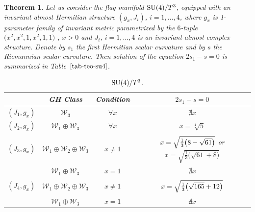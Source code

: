 \documentclass[10pt,a4paper]{amsart}
\numberwithin{equation}{section}
\newtheorem{Theorem}{Theorem}[section]
\begin{document}
\begin{Theorem} \label{teo-su4-t}
Let us consider the flag manifold ${\rm SU}(4)/T^3$, equipped with an invariant almost Hermitian structure $(g_x,J_i)$, $i=1,\ldots, 4$, where $g_x$ is 1-parameter family of invariant metric parametrized by the $6$-tuple $\big(x^{2},x^{2},1,x^{2},1,1\big)$ , $x>0$ and $J_i$, $i=1,\ldots, 4$ is an invariant almost complex structure. Denote by $s_1$ the first Hermitian scalar curvature and by $s$ the Riemannian scalar curvature. Then solution of the equation $2s_1-s=0$ is summarized in Table~$\ref{tab-teo-su4}$.

\begin{table}[h]\setlength{\tabcolsep}{4.5pt}
\renewcommand{\arraystretch}{1.2}
\centering
\caption{${\rm SU}(4)/T^3$.} \label{tab-teo-su4}
\begin{tabular}{c|c|c|c}\hline
 & GH Class & Condition & $2s_{1}-s=0$
 \\
\hline
$(J_{1},g_x)$ & $\mathcal{W}_{3}$ & $\forall x$ & $\nexists x$
\\
\hline
$(J_{2},g_x)$ & $\mathcal{W}_{1}\oplus \mathcal{W}_{3}$ & $\forall x$ & $x=\sqrt[4]{5}$
\\
\hline
$(J_{3},g_x)$ & $\mathcal{W}_{1}\oplus \mathcal{W}_{2}\oplus\mathcal{W}_{3}$ & $x\neq1$ & $\vphantom{\dfrac13^2}x=\sqrt{\frac{1}{3} \big(8-\sqrt{61}\big)}$ or $x=\sqrt{\frac{1}{3} \big(\sqrt{61}+8\big)}$
\\
 & $\mathcal{W}_{1}\oplus\mathcal{W}_{3}$ & $x=1$ & $\nexists x$
 \\
\hline
$(J_{4},g_x)$ & $\mathcal{W}_{1}\oplus \mathcal{W}_{2}\oplus\mathcal{W}_{3}$ & $x\neq1$ & $\vphantom{\dfrac13^2}x=\sqrt{\frac{1}{3} \big(\sqrt{165}+12\big)}$
\\
 & $\mathcal{W}_{1}\oplus\mathcal{W}_{3}$ & $x=1$ & $\nexists x$
 \\
\hline
\end{tabular}
\end{table}
\end{Theorem}
\end{document}

